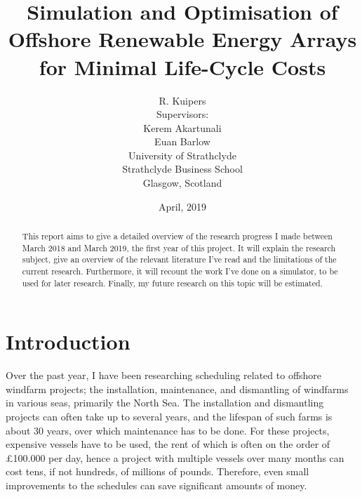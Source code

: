\documentclass[a4paper,12pt]{article}
\begin{document}
\title{Simulation and Optimisation of Offshore Renewable Energy Arrays for Minimal Life-Cycle Costs}
\author{R. Kuipers \\[1cm] Supervisors: \\ Kerem Akartunali \\ Euan Barlow\\[2cm] University of Strathclyde \\ Strathclyde Business School \\ {\small Glasgow, Scotland}}
\date{April, 2019}

\maketitle

\pagebreak

\begin{abstract}
This report aims to give a detailed overview of the research progress I made between March 2018 and March 2019, the first year of this project. It will explain the research subject, give an overview of the relevant literature I've read and the limitations of the current research. Furthermore, it will recount the work I've done on a simulator, to be used for later research. Finally, my future research on this topic will be estimated. 
\end{abstract}

\pagebreak

\tableofcontents

\pagebreak

\section{Introduction} \label{s:intro}
Over the past year, I have been researching scheduling related to offshore windfarm projects; the installation, maintenance, and dismantling of windfarms in various seas, primarily the North Sea. The installation and dismantling projects can often take up to several years, and the lifespan of such farms is about 30 years, over which maintenance has to be done. For these projects, expensive vessels have to be used, the rent of which is often on the order of \pounds 100.000 per day, hence a project with multiple vessels over many months can cost tens, if not hundreds, of millions of pounds.  Therefore, even small improvements to the schedules can save significant amounts of money. %
\end{document}
